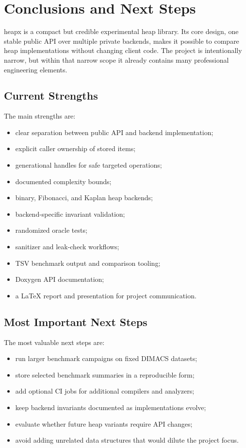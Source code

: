 \chapter{Conclusions and Next Steps}

heapx is a compact but credible experimental heap library.
Its core design, one stable public API over multiple private backends, makes it possible to compare heap implementations without changing client code.
The project is intentionally narrow, but within that narrow scope it already contains many professional engineering elements.

\section{Current Strengths}

The main strengths are:

\begin{itemize}
    \item clear separation between public API and backend implementation;
    \item explicit caller ownership of stored items;
    \item generational handles for safe targeted operations;
    \item documented complexity bounds;
    \item binary, Fibonacci, and Kaplan heap backends;
    \item backend-specific invariant validation;
    \item randomized oracle tests;
    \item sanitizer and leak-check workflows;
    \item TSV benchmark output and comparison tooling;
    \item Doxygen API documentation;
    \item a LaTeX report and presentation for project communication.
\end{itemize}

\section{Most Important Next Steps}

The most valuable next steps are:

\begin{itemize}
    \item run larger benchmark campaigns on fixed DIMACS datasets;
    \item store selected benchmark summaries in a reproducible form;
    \item add optional CI jobs for additional compilers and analyzers;
    \item keep backend invariants documented as implementations evolve;
    \item evaluate whether future heap variants require API changes;
    \item avoid adding unrelated data structures that would dilute the project focus.
\end{itemize}

